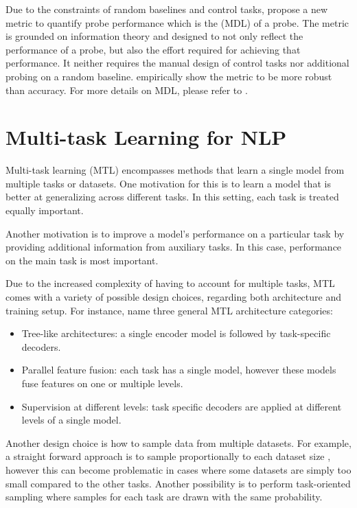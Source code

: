 Due to the constraints of random baselines and control tasks, \citep{voita-titov-2020-information} propose a new metric to quantify probe performance which is the  (MDL) of a probe. The metric is grounded on information theory \citep{shannon1948mathematical} and designed to not only reflect the performance of a probe, but also the effort required for achieving that performance. It neither requires the manual design of control tasks nor additional probing on a random baseline. \citep{voita-titov-2020-information} empirically show the metric to be more robust than accuracy. For more details on MDL, please refer to .

\section{Multi-task Learning for NLP}
Multi-task learning (MTL) encompasses methods that learn a single model from multiple tasks or datasets. One motivation for this is to learn a model that is better at generalizing across different tasks. In this setting, each task is treated equally important.

Another motivation is to improve a model's performance on a particular task by providing additional information from auxiliary tasks. In this case, performance on the main task is most important.

Due to the increased complexity of having to account for multiple tasks, MTL comes with a variety of possible design choices, regarding both architecture and training setup. For instance, \citet{DBLP:journals/corr/abs-2109-09138} name three general MTL architecture categories:
\begin{itemize}
    \item Tree-like architectures: a single encoder model is followed by task-specific decoders.
    \item Parallel feature fusion: each task has a single model, however these models fuse features on one or multiple levels.
    \item Supervision at different levels: task specific decoders are applied at different levels of a single model.
\end{itemize}
Another design choice is how to sample data from multiple datasets. For example, a straight forward approach is to sample proportionally to each dataset size \citep{DBLP:journals/corr/abs-1811-06031}, however this can become problematic in cases where some datasets are simply too small compared to the other tasks. Another possibility is to perform task-oriented sampling \citep{DBLP:journals/corr/ZhangXWJ17} where samples for each task are drawn with the same probability.

